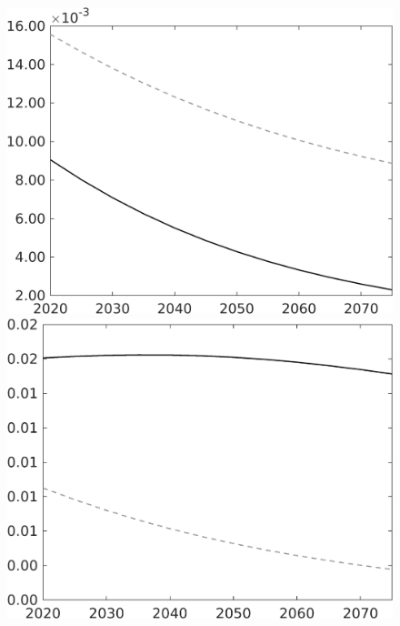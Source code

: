 \documentclass[12pt]{article}
\begin{document}
\begin{figure}
\begin{minipage}[]{0.32\textwidth}
\end{minipage}
\begin{minipage}[]{0.32\textwidth}
\includegraphics[width=1\textwidth]{../../codding_model/own_basedOnFried/optimalPol_010922_revision/figures/all_13Sept22/LevTaufNoTauf_TaulCalib_Equlab_regime0_wsf_spillover0_nsk0_xgr0_knspil1_sep1_LFlimit0_emsbase0_countec0_GovRev0_etaa0.79_lgd0.png}
\end{minipage}
\begin{minipage}[]{0.32\textwidth}
\includegraphics[width=1\textwidth]{../../codding_model/own_basedOnFried/optimalPol_010922_revision/figures/all_13Sept22/LevTaufNoTauf_TaulCalib_Equlab_regime0_wsg_spillover0_nsk0_xgr0_knspil1_sep1_LFlimit0_emsbase0_countec0_GovRev0_etaa0.79_lgd0.png}

\end{minipage}
\end{figure}
\end{document}

